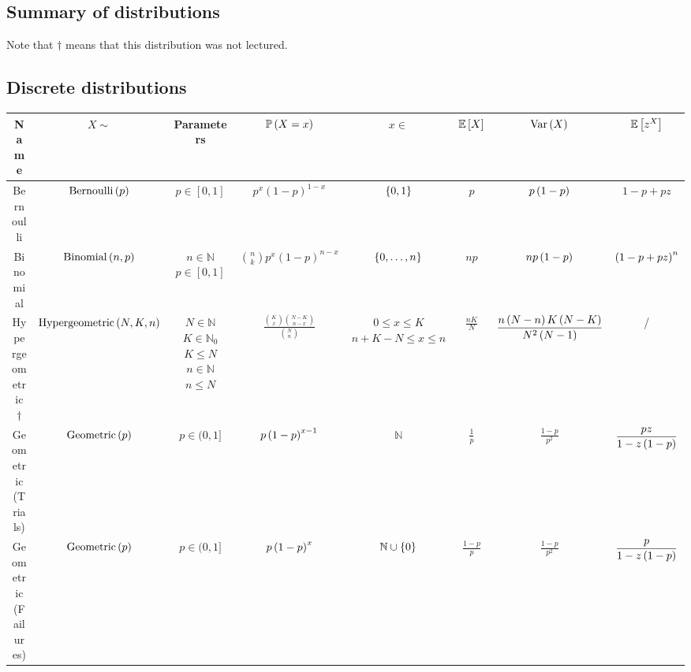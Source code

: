 \documentclass{article}
\theoremstyle{definition}
\theoremstyle{remark}
\newcommand{\NN}{\mathbb{N}}
\newcommand{\Prob}{\mathbb{P}}
\newcommand{\Expt}{\mathbb{E}}
\newcommand{\ccintv}[2]{[#1,#2]}
\newcommand{\ocintv}[2]{(#1,#2]}
\newcommand{\Var}{\operatorname{Var}}
\newcommand{\Bernoulli}{\operatorname{Bernoulli}}
\newcommand{\Binomial}{\operatorname{Binomial}}
\newcommand{\Geometric}{\operatorname{Geometric}}
\newcommand{\Hypergeometric}{\operatorname{Hypergeometric}}
\begin{document}
\begin{landscape}
\section{Summary of distributions}

Note that \(\dagger\) means that this distribution was not lectured.

\newcommand{\dsty}{\displaystyle}

\subsection{Discrete distributions}
\begin{table}[ht!]
    \centering
    \begin{tabular}{c|cc|cc|cc|c}
        \hline \hline
        \textbf{Name} & \(X \sim\) & \textbf{Parameters} & \(\Prob\pqty{X = x}\) & \(x \in\) & \(\Expt\bqty{X}\) & \(\Var\pqty{X}\) & \(\Expt\bqty{z^X}\) \\
        \hline\hline
        Bernoulli & \(\Bernoulli\pqty{p}\) & \(p \in \ccintv{0}{1}\) & \(p^x(1 - p)^{1 - x}\) & \(\Bqty{0, 1}\) & \(p\) & \(p \pqty{1 - p}\) & \(1 - p + pz\) \\
        \hline
        Binomial & \(\Binomial\pqty{n, p}\) & \makecell{\(n \in \NN\) \\ \(p \in \ccintv{0}{1}\)} & \(\dsty \binom{n}{k} p^x (1 - p)^{n - x}\) & \(\Bqty{0, \ldots, n}\) & \(np\) &\(np\pqty{1 - p}\) & \(\pqty{1 - p + pz}^n\) \\
        \hline 
        Hypergeometric \(\dagger\) & \(\Hypergeometric\pqty{N, K, n}\) & \makecell{\(N \in \NN\) \\ \(K \in \NN_0\) \\ \(K \leq N\) \\ \(n \in \NN\) \\ \(n \leq N\)} & \(\dsty \frac{\binom{K}{x} \binom{N - K}{n - x}}{\binom{N}{n}}\) & \makecell{\(0 \leq x \leq K\) \\ \(n + K - N \leq x \leq n\)} & \(\dsty \frac{nK}{N}\) & \(\dsty \frac{n \pqty{N - n} K \pqty{N - K}}{N^2 \pqty{N - 1}}\) & / \\
        \hline
        \makecell{Geometric \\ (Trials)} & \(\Geometric\pqty{p}\) & \(p \in \ocintv{0}{1}\) & \(p \pqty{1 - p}^{x - 1}\) & \(\NN\) & \(\dsty \frac{1}{p}\) & \(\dsty \frac{1 - p}{p^2}\) & \(\dsty \frac{pz}{1 - z\pqty{1 - p}}\) \\
        \hline
        \makecell{Geometric \\ (Failures)} & \(\Geometric\pqty{p}\) & \(p \in \ocintv{0}{1}\) & \(p \pqty{1 - p}^{x}\) & \(\NN \cup \Bqty{0}\) & \(\dsty \frac{1 - p}{p}\) & \(\dsty \frac{1 - p}{p^2}\) & \(\dsty \frac{p}{1 - z\pqty{1 - p}}\) \\

\end{tabular}
\end{table}
\end{landscape}
\end{document}
